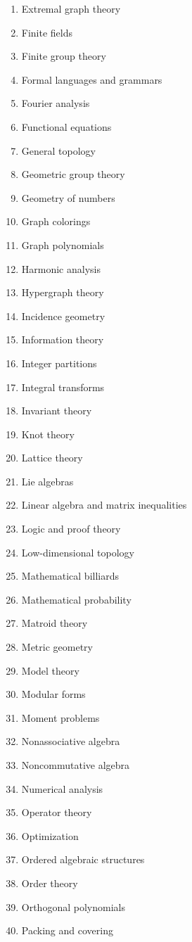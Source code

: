\begin{enumerate}[label=\arabic*.,itemsep=0pt,topsep=0pt,leftmargin=2.7em]
\item Extremal graph theory
\item Finite fields
\item Finite group theory
\item Formal languages and grammars
\item Fourier analysis
\item Functional equations
\item General topology
\item Geometric group theory
\item Geometry of numbers
\item Graph colorings
\item Graph polynomials
\item Harmonic analysis
\item Hypergraph theory
\item Incidence geometry
\item Information theory
\item Integer partitions
\item Integral transforms
\item Invariant theory
\item Knot theory
\item Lattice theory
\item Lie algebras
\item Linear algebra and matrix inequalities
\item Logic and proof theory
\item Low-dimensional topology
\item Mathematical billiards
\item Mathematical probability
\item Matroid theory
\item Metric geometry
\item Model theory
\item Modular forms
\item Moment problems
\item Nonassociative algebra
\item Noncommutative algebra
\item Numerical analysis
\item Operator theory
\item Optimization
\item Ordered algebraic structures
\item Order theory
\item Orthogonal polynomials
\item Packing and covering

\end{enumerate}
